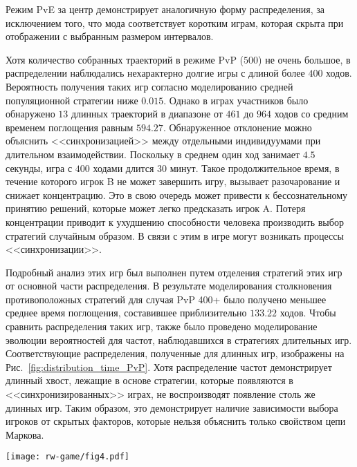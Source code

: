 Режим PvE за центр демонстрирует аналогичную форму распределения, за исключением того, что мода соответствует коротким играм, которая скрыта при отображении с выбранным размером интервалов.

Хотя количество собранных траекторий в режиме PvP ($500$) не очень большое, в распределении наблюдались нехарактерно долгие игры с длиной более $400$ ходов. Вероятность получения таких игр согласно моделированию средней популяционной стратегии ниже $0.015$. Однако в играх участников было обнаружено $13$ длинных траекторий в диапазоне от $461$ до $964$ ходов со средним временем поглощения равным $594.27$. Обнаруженное отклонение можно объяснить <<синхронизацией>> между отдельными индивидуумами при длительном взаимодействии. Поскольку в среднем один ход занимает $4.5$ секунды, игра с $400$ ходами длится $30$ минут. Такое продолжительное время, в течение которого игрок B не может завершить игру, вызывает разочарование и снижает концентрацию. Это в свою очередь может привести к бессознательному принятию решений, которые может легко предсказать игрок A. Потеря концентрации приводит к ухудшению способности человека производить выбор стратегий случайным образом. В связи с этим в игре могут возникать процессы <<синхронизации>>.

Подробный анализ этих игр был выполнен путем отделения стратегий этих игр от основной части распределения. В результате моделирования столкновения противоположных стратегий для случая PvP 400+ было получено меньшее среднее время поглощения, составившее приблизительно $133.22$ ходов. Чтобы сравнить распределения таких игр, также было проведено моделирование эволюции вероятностей для частот, наблюдавшихся в стратегиях длительных игр. Соответствующие распределения, полученные для длинных игр, изображены на Рис.~\cref{fig:distribution_time_PvP}. Хотя распределение частот демонстрирует длинный хвост, лежащие в основе стратегии, которые появляются в <<синхронизированных>> играх, не воспроизводят появление столь же длинных игр. Таким образом, это демонстрирует наличие зависимости выбора игроков от скрытых факторов, которые нельзя объяснить только свойством цепи Маркова.

\begin{figure*}[t]
    \centering
    \texttt{[image: rw-game/fig4.pdf]}
    \caption{
        Распределение времени поглощения для режима PvP (желтая гистограмма и фиолетовая линия) по сравнению с моделированием частот направлений движения (зеленая линия) и частот стратегий (синяя линия), наблюдаемых в длительных играх (более $400$ ходов). Частоты направлений движения для каждого состояния, полученные в экспериментальных длинных играх, использовались для моделирования эволюции вероятностей найти фишку в узлах решетки. Стратегии обоих игроков A и B в PvP с длиной ходов более $400$ использовались отдельно при моделировании.
    }  
    \label{fig:distribution_time_PvP}

\end{figure*}


